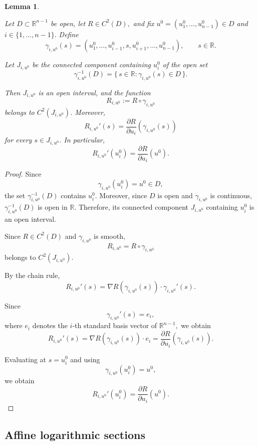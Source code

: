 \documentclass[12pt]{amsart}
\newtheorem{lemma}{Lemma}[section]
\begin{document}
\begin{lemma}
\label{lem:coordinate-lines}

Let
\(
D\subset\mathbb R^{n-1}
\)
be open, let
\(
R\in C^2(D),
\)
and fix
\(
u^0=(u_1^0,\ldots,u_{n-1}^0)\in D
\)
and
\(
i\in\{1,\ldots,n-1\}.
\)
Define
\[
\gamma_{i,u^0}(s)
=
(u_1^0,\ldots,u_{i-1}^0,s,
u_{i+1}^0,\ldots,u_{n-1}^0),
\qquad s\in\mathbb R.
\]

Let \(J_{i,u^0}\) be the connected component containing \(u_i^0\) of
the open set
\[
\gamma_{i,u^0}^{-1}(D)
=
\{\,s\in\mathbb R:\gamma_{i,u^0}(s)\in D\,\}.
\]

Then \(J_{i,u^0}\) is an open interval, and the function
\[
R_{i,u^0}
:=
R\circ\gamma_{i,u^0}
\]
belongs to \(C^2(J_{i,u^0})\). Moreover,
\[
R_{i,u^0}'(s)
=
\frac{\partial R}{\partial u_i}
\left(
\gamma_{i,u^0}(s)
\right)
\]
for every \(s\in J_{i,u^0}\). In particular,
\[
R_{i,u^0}'(u_i^0)
=
\frac{\partial R}{\partial u_i}(u^0).
\]

\end{lemma}

\begin{proof}

Since
\[
\gamma_{i,u^0}(u_i^0)=u^0\in D,
\]
the set
\(
\gamma_{i,u^0}^{-1}(D)
\)
contains \(u_i^0\). Moreover, since \(D\) is open and
\(\gamma_{i,u^0}\) is continuous,
\(
\gamma_{i,u^0}^{-1}(D)
\)
is open in \(\mathbb R\). Therefore, its connected component
\(J_{i,u^0}\) containing \(u_i^0\) is an open interval.

Since
\(
R\in C^2(D)
\)
and
\(
\gamma_{i,u^0}
\)
is smooth,
\[
R_{i,u^0}
=
R\circ\gamma_{i,u^0}
\]
belongs to
\(
C^2(J_{i,u^0}).
\)

By the chain rule,
\[
R_{i,u^0}'(s)
=
\nabla R\!\left(\gamma_{i,u^0}(s)\right)\cdot
\gamma_{i,u^0}'(s).
\]

Since
\[
\gamma_{i,u^0}'(s)=e_i,
\]
where
\(
e_i
\)
denotes the \(i\)-th standard basis vector of
\(
\mathbb R^{n-1},
\)
we obtain
\[
R_{i,u^0}'(s)
=
\nabla R\!\left(\gamma_{i,u^0}(s)\right)\cdot e_i
=
\frac{\partial R}{\partial u_i}
\left(
\gamma_{i,u^0}(s)
\right).
\]

Evaluating at
\(
s=u_i^0
\)
and using
\[
\gamma_{i,u^0}(u_i^0)=u^0,
\]
we obtain
\[
R_{i,u^0}'(u_i^0)
=
\frac{\partial R}{\partial u_i}(u^0).
\]

\end{proof}


\subsection{Affine logarithmic sections}
\end{document}
